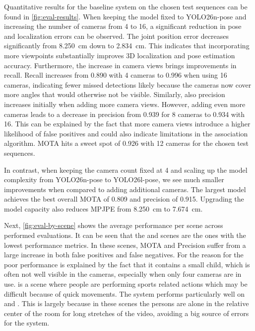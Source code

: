 Quantitative results for the baseline system on the chosen test sequences can be found in \cref{fig:eval-results}. When keeping the model fixed to YOLO26n-pose and increasing the number of cameras from 4 to 16, a significant reduction in pose and localization errors can be observed. The joint position error decreases significantly from 8.250 cm down to 2.834 cm. This indicates that incorporating more viewpoints substantially improves 3D localization and pose estimation accuracy. Furthermore, the increase in camera views brings improvements in recall. Recall increases from 0.890 with 4 cameras to 0.996 when using 16 cameras, indicating fewer missed detections likely because the cameras now cover more angles that would otherwise not be visible. Similarly, also precision increases initially when adding more camera views. However, adding even more cameras leads to a decrease in precision from 0.939 for 8 cameras to 0.934 with 16. This can be explained by the fact that more camera views introduce a higher likelihood of false positives and could also indicate limitations in the association algorithm. MOTA hits a sweet spot of 0.926 with 12 cameras for the chosen test sequences. 

In contrast, when keeping the camera count fixed at 4 and scaling up the model complexity from YOLO26n-pose to YOLO26l-pose, we see much smaller improvements when compared to adding additional cameras. The largest model achieves the best overall MOTA of 0.809 and precision of 0.915. Upgrading the model capacity also reduces MPJPE from 8.250 cm to 7.674 cm.

Next, \cref{fig:eval-by-scene} shows the average performance per scene across performed evaluations. It can be seen that the  and  scenes are the ones with the lowest performance metrics. In these scenes, MOTA and Precision suffer from a large increase in both false positives and false negatives. For  the reason for the poor performance is explained by the fact that it contains a small child, which is often not well visible in the cameras, especially when only four cameras are in use.  is a scene where people are performing sports related actions which may be difficult because of quick movements. The system performs particularly well on  and . This is largely because in these scenes the persons are alone in the relative center of the room for long stretches of the video, avoiding a big source of errors for the system.

